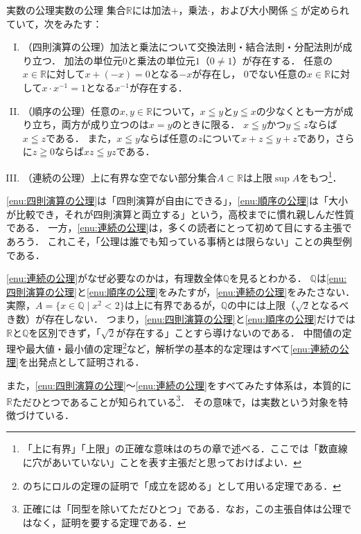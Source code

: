 \begin{axiom}{実数の公理}{実数の公理}
  集合$\mathbb{R}$には加法$+$，乗法$\cdot$，および大小関係$\leqq$が定められていて，次をみたす：
  \begin{enumerate}[(I)]
    \item （四則演算の公理）加法と乗法について交換法則・結合法則・分配法則が成り立つ．
      加法の単位元$0$と乗法の単位元$1$（$0 \ne 1$）が存在する．
      任意の$x \in \mathbb{R}$に対して$x + (-x) = 0$となる$-x$が存在し，
      $0$でない任意の$x \in \mathbb{R}$に対して$x \cdot x^{-1} = 1$となる$x^{-1}$が存在する．\label{enu:四則演算の公理}
    \item （順序の公理）任意の$x, y \in \mathbb{R}$について，$x \leqq y$と$y \leqq x$の少なくとも一方が成り立ち，両方が成り立つのは$x = y$のときに限る．
      $x \leqq y$かつ$y \leqq z$ならば$x \leqq z$である．
      また，$x \leqq y$ならば任意の$z$について$x + z \leqq y + z$であり，さらに$z \geqq 0$ならば$xz \leqq yz$である．\label{enu:順序の公理}
    \item （連続の公理）上に有界な空でない部分集合$A \subset \mathbb{R}$は上限$\sup A$をもつ\footnote{「上に有界」「上限」の正確な意味はのちの章で述べる．ここでは「数直線に穴があいていない」ことを表す主張だと思っておけばよい．}．\label{enu:連続の公理}
  \end{enumerate}
\end{axiom}

\ref{enu:四則演算の公理}は「四則演算が自由にできる」，\ref{enu:順序の公理}は「大小が比較でき，それが四則演算と両立する」という，高校までに慣れ親しんだ性質である．
一方，\ref{enu:連続の公理}は，多くの読者にとって初めて目にする主張であろう．
これこそ，「公理は誰でも知っている事柄とは限らない」ことの典型例である．

\ref{enu:連続の公理}がなぜ必要なのかは，有理数全体$\mathbb{Q}$を見るとわかる．
$\mathbb{Q}$は\ref{enu:四則演算の公理}と\ref{enu:順序の公理}をみたすが，\ref{enu:連続の公理}をみたさない．
実際，$A = \{ x \in \mathbb{Q} \mid x^2 < 2 \}$は上に有界であるが，$\mathbb{Q}$の中には上限（$\sqrt{2}$となるべき数）が存在しない．
つまり，\ref{enu:四則演算の公理}と\ref{enu:順序の公理}だけでは$\mathbb{R}$と$\mathbb{Q}$を区別できず，「$\sqrt{2}$が存在する」ことすら導けないのである．
中間値の定理や最大値・最小値の定理\footnote{のちにロルの定理の証明で「成立を認める」として用いる定理である．}など，解析学の基本的な定理はすべて\ref{enu:連続の公理}を出発点として証明される．

また，\ref{enu:四則演算の公理}〜\ref{enu:連続の公理}をすべてみたす体系は，本質的に$\mathbb{R}$ただひとつであることが知られている\footnote{正確には「同型を除いてただひとつ」である．なお，この主張自体は公理ではなく，証明を要する定理である．}．
その意味で，は実数という対象を特徴づけている．


